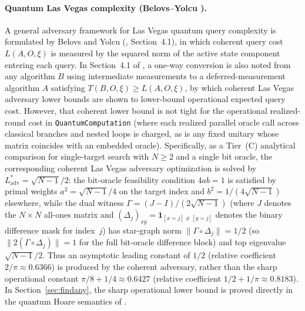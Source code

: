 \documentclass[11pt,a4paper]{article}
\theoremstyle{definition}
\theoremstyle{remark}
\begin{document}
\paragraph{Quantum Las Vegas complexity (Belovs--Yolcu \cite{belovs2023}).}
A general adversary framework for Las Vegas quantum query complexity is formulated by Belovs and Yolcu (\cite{belovs2023}, Section~4.1), in which coherent query cost \(L(A, O, \xi)\) is measured by the squared norm of the active state component entering each query. In Section~4.1 of \cite{belovs2023}, a one-way conversion is also noted from any algorithm \(B\) using intermediate measurements to a deferred-measurement algorithm \(A\) satisfying \(T(B, O, \xi) \ge L(A, O, \xi)\), by which coherent Las Vegas adversary lower bounds are shown to lower-bound operational expected query cost. However, that coherent lower bound is not tight for the operational realized-round cost in \texttt{Quantum\allowbreak Computation} (where each realized parallel oracle call across classical branches and nested loops is charged, as is any fixed unitary whose matrix coincides with an embedded oracle). Specifically, as a Tier~(C) analytical comparison for single-target search with \(N \ge 2\) and a single bit oracle, the corresponding coherent Las Vegas adversary optimization is solved by \(L_{\mathrm{adv}}^* = \sqrt{N-1}/2\): the bit-oracle feasibility condition \(4ab = 1\) is satisfied by primal weights \(a^2 = \sqrt{N-1}/4\) on the target index and \(b^2 = 1/(4\sqrt{N-1})\) elsewhere, while the dual witness \(\Gamma = (J - I)/(2\sqrt{N-1})\) (where \(J\) denotes the \(N \times N\) all-ones matrix and \((\Delta_j)_{xy} = \mathbf{1}_{[x=j]\ne[y=j]}\) denotes the binary difference mask for index~\(j\)) has star-graph norm \(\|\Gamma \circ \Delta_j\| = 1/2\) (so \(\|2(\Gamma \circ \Delta_j)\| = 1\) for the full bit-oracle difference block) and top eigenvalue \(\sqrt{N-1}/2\). Thus an asymptotic leading constant of \(1/2\) (relative coefficient \(2/\pi \approx 0.6366\)) is produced by the coherent adversary, rather than the sharp operational constant \(\pi/8 + 1/4 \approx 0.6427\) (relative coefficient \(1/2 + 1/\pi \approx 0.8183\)). In Section~\ref{sec:findany}, the sharp operational lower bound is proved directly in the quantum Hoare semantics of \cite{feng2021,shirobokov2026}.
\end{document}
